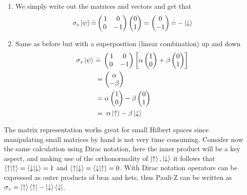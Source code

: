 \begin{enumerate}[label = \textbf{\alph*)}]
\item We simply write out the matrices and vectors and get that
\begin{equation}
\sigma_z\ket{\psi} \dot{=} \begin{pmatrix}
\,1 & 0 \\
0 & -1 \\
\end{pmatrix}\begin{pmatrix}
0 \\ 1
\end{pmatrix} = \begin{pmatrix}
0 \\ -1
\end{pmatrix} \dot{=} -\ket{\downarrow}
\end{equation}

\item Same as before but with a superposition (linear combination) up and down 
\begin{equation}
\begin{aligned}
\sigma_z\ket{\psi} \; &\dot{=} \;\begin{pmatrix}
\,1 & 0 \\
0 & -1 \\
\end{pmatrix}\left[\alpha\begin{pmatrix}
1 \\ 0
\end{pmatrix} + \beta\begin{pmatrix}
0 \\ 1
\end{pmatrix} \right] \\ &= \begin{pmatrix}
\alpha \\ -\beta
\end{pmatrix}  \\&= \alpha\begin{pmatrix}
1 \\ 0
\end{pmatrix} -\beta\begin{pmatrix}
0 \\ 1
\end{pmatrix} \\&= \;\alpha\ket{\uparrow} - \beta\ket{\downarrow}
\end{aligned}
\end{equation}
\end{enumerate}
The matrix representation works great for small Hilbert spaces since manipulating small matrices by hand is not very time consuming. Consider now the same calculation using Dirac notation, here the inner product will be a key aspect, and making use of the orthonormality of $\ket{\uparrow},\ket{\downarrow}$ it follows that $\bra{\uparrow}\ket{\uparrow} = \bra{\downarrow}\ket{\downarrow} = 1$ and $\bra{\uparrow}\ket{\downarrow} = \bra{\downarrow}\ket{\uparrow} = 0$.
With Dirac notation operators can be expressed as outer products of bras and kets, thus Pauli-Z can be written as $\sigma_z = \ket{\uparrow}\bra{\uparrow} - \ket{\downarrow}\bra{\downarrow}$.

